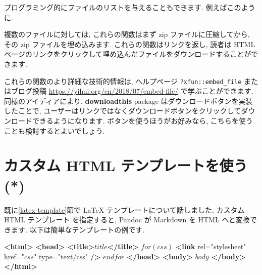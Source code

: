 \documentclass[
  11pt,
  lualatex,ja=standard,jafont=noto]{bxjsreport}
\newenvironment{Shaded}{\begin{snugshade}}{\end{snugshade}}
\newcommand{\CommentTok}[1]{\textcolor[rgb]{0.56,0.35,0.01}{\textit{#1}}}
\newcommand{\FunctionTok}[1]{\textcolor[rgb]{0.00,0.00,0.00}{#1}}
\newcommand{\KeywordTok}[1]{\textcolor[rgb]{0.13,0.29,0.53}{\textbf{#1}}}
\newcommand{\NormalTok}[1]{#1}
\newcommand{\OtherTok}[1]{\textcolor[rgb]{0.56,0.35,0.01}{#1}}
\newcommand{\SpecialCharTok}[1]{\textcolor[rgb]{0.00,0.00,0.00}{#1}}
\newcommand{\StringTok}[1]{\textcolor[rgb]{0.31,0.60,0.02}{#1}}
\begin{document}
プログラミング的にファイルのリストを与えることもできます. 例えばこのように.

\begin{Shaded}
\end{Shaded}

複数のファイルに対しては, これらの関数はまず zip ファイルに圧縮してから, その zip ファイルを埋め込みます. これらの関数はリンクを返し, 読者は HTML ページのリンクをクリックして埋め込んだファイルをダウンロードすることができます.

これらの関数のより詳細な技術的情報は, ヘルプページ \texttt{?xfun::embed\_file} またはブログ投稿 \url{https://yihui.org/en/2018/07/embed-file/} で学ぶことができます. 同様のアイディアにより, \textbf{downloadthis} package \autocite{R-downloadthis} はダウンロードボタンを実装したことで, ユーザーはリンクではなくダウンロードボタンをクリックしてダウンロードできるようになります. ボタンを使うほうがお好みなら, こちらを使うことも検討するとよいでしょう.

\hypertarget{html-template}{%
\section{カスタム HTML テンプレートを使う (*)}\label{html-template}}

既に\ref{latex-template}節で LaTeX テンプレートについて話しました. カスタム HTML テンプレート を指定すると, Pandoc が Markdown を HTML へと変換できます. 以下は簡単なテンプレートの例です.

\begin{Shaded}
\begin{Highlighting}[]
\KeywordTok{\textless{}html\textgreater{}}
  \KeywordTok{\textless{}head\textgreater{}}
    \KeywordTok{\textless{}title\textgreater{}}\NormalTok{$title$}\KeywordTok{\textless{}/title\textgreater{}}
\NormalTok{    $for(css)$}
    \KeywordTok{\textless{}link}\OtherTok{ rel=}\StringTok{"stylesheet"}\OtherTok{ href=}\StringTok{"$css$"}\OtherTok{ type=}\StringTok{"text/css"} \KeywordTok{/\textgreater{}}
\NormalTok{    $endfor$}
  \KeywordTok{\textless{}/head\textgreater{}}
  \KeywordTok{\textless{}body\textgreater{}}
\NormalTok{  $body$}
  \KeywordTok{\textless{}/body\textgreater{}}
\KeywordTok{\textless{}/html\textgreater{}}
\end{Highlighting}
\end{Shaded}
\end{document}
